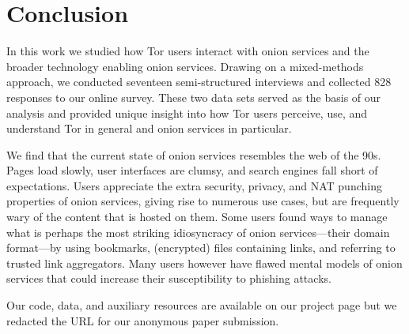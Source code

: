 \section{Conclusion}
\label{sec:conclusion}

In this work we studied how Tor users interact with onion services and the
broader technology enabling onion services.  Drawing on a mixed-methods
approach, we conducted seventeen semi-structured interviews and collected 828
responses to our online survey.  These two data sets served as the basis of our
analysis and provided unique insight into how Tor users perceive, use, and
understand Tor in general and onion services in particular.

We find that the current state of onion services resembles the web of the 90s.
Pages load slowly, user interfaces are clumsy, and search engines fall short of
expectations.  Users appreciate the extra security, privacy, and NAT punching
properties of onion services, giving rise to numerous use cases, but are
frequently wary of the content that is hosted on them.  Some users found ways to
manage what is perhaps the most striking idiosyncracy of onion services---their
domain format---by using bookmarks, (encrypted) files containing links, and
referring to trusted link aggregators.  Many users however have flawed mental
models of onion services that could increase their susceptibility to phishing
attacks.

Our code, data, and auxiliary resources are available on our project page but we
redacted the URL for our anonymous paper submission.
